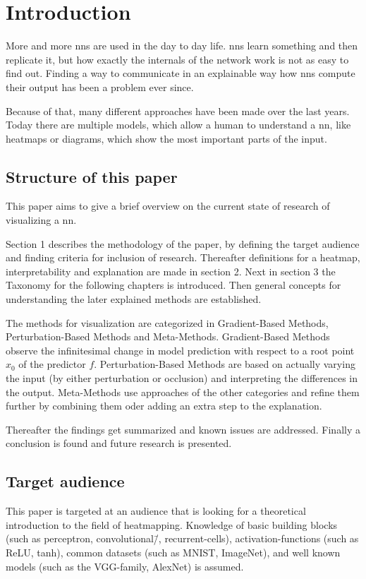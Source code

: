 \section{Introduction}
More and more \glspl{nn} are used in the day to day life. \glspl{nn} learn something and then replicate it, but how exactly the internals of the network work is not as easy to find out. Finding a way to communicate in an explainable way how \glspl{nn} compute their output has been a problem ever since. 
\par 
Because of that, many different approaches have been made over the last years. Today there are multiple models, which allow a human to understand a \gls{nn}, like heatmaps or diagrams, which show the most important parts of the input.

\subsection{Structure of this paper}
This paper aims to give a brief overview on the current state of research of visualizing a \gls{nn}. 
\par 
Section 1 describes the methodology of the paper, by defining the target audience and finding criteria for inclusion of research. Thereafter definitions for a heatmap, interpretability and explanation are made in section 2. Next in section 3 the Taxonomy for the following chapters is introduced. Then general concepts for understanding the later explained methods are established.
\par
The methods for visualization are categorized in Gradient-Based Methods, Perturbation-Based Methods and Meta-Methods.
Gradient-Based Methods observe the infinitesimal change in model prediction with respect to a root point \(x_0\) of the predictor \(f\).
Perturbation-Based Methods are based on actually varying the input (by either  perturbation or occlusion) and interpreting the differences in the output.
Meta-Methods use approaches of the other categories and refine them further by combining them oder adding an extra step to the explanation.
\par
Thereafter the findings get summarized and known issues are addressed.
Finally a conclusion is found and future research is presented.

\subsection{Target audience}
This paper is targeted at an audience that is looking for a theoretical introduction to the field of heatmapping. Knowledge of basic building blocks (such as perceptron, convolutional\=/, recurrent-cells), activation-functions (such as ReLU, tanh), common datasets (such as MNIST, ImageNet), and well known models (such as the VGG-family, AlexNet) is assumed.

